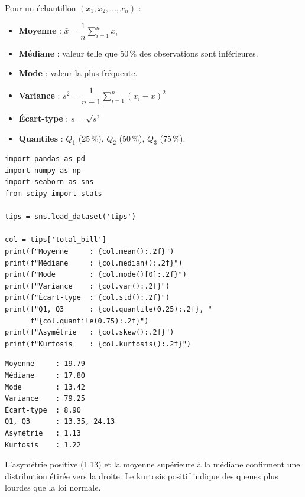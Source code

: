 \begin{definition}
Pour un \'echantillon $(x_1, x_2, \ldots, x_n)$ :
\begin{itemize}
    \item \textbf{Moyenne} : $\bar{x} = \dfrac{1}{n}\displaystyle\sum_{i=1}^{n} x_i$
    \item \textbf{M\'ediane} : valeur telle que 50\,\% des observations sont inf\'erieures.
    \item \textbf{Mode} : valeur la plus fr\'equente.
    \item \textbf{Variance} : $s^2 = \dfrac{1}{n-1}\displaystyle\sum_{i=1}^{n}(x_i - \bar{x})^2$
    \item \textbf{\'Ecart-type} : $s = \sqrt{s^2}$
    \item \textbf{Quantiles} : $Q_1$ (25\,\%), $Q_2$ (50\,\%), $Q_3$ (75\,\%).
\end{itemize}
\end{definition}

\begin{codeblock}[title=\textbf{Python}]
\begin{verbatim}
import pandas as pd
import numpy as np
import seaborn as sns
from scipy import stats

tips = sns.load_dataset('tips')

col = tips['total_bill']
print(f"Moyenne     : {col.mean():.2f}")
print(f"Médiane     : {col.median():.2f}")
print(f"Mode        : {col.mode()[0]:.2f}")
print(f"Variance    : {col.var():.2f}")
print(f"Écart-type  : {col.std():.2f}")
print(f"Q1, Q3      : {col.quantile(0.25):.2f}, "
      f"{col.quantile(0.75):.2f}")
print(f"Asymétrie   : {col.skew():.2f}")
print(f"Kurtosis    : {col.kurtosis():.2f}")
\end{verbatim}
\end{codeblock}

\begin{codeoutput}
\begin{verbatim}
Moyenne     : 19.79
Médiane     : 17.80
Mode        : 13.42
Variance    : 79.25
Écart-type  : 8.90
Q1, Q3      : 13.35, 24.13
Asymétrie   : 1.13
Kurtosis    : 1.22
\end{verbatim}
\end{codeoutput}

\begin{remarque}
L'asym\'etrie positive (1.13) et la moyenne sup\'erieure \`a la m\'ediane confirment une distribution \'etir\'ee vers la droite. Le kurtosis positif indique des queues plus lourdes que la loi normale.
\end{remarque}

